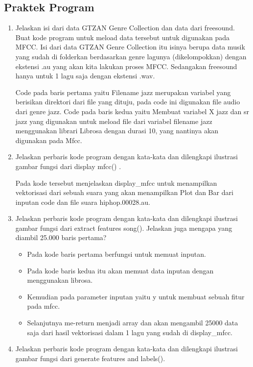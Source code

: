 \subsection{Praktek Program}
\begin{enumerate}
\item Jelaskan isi dari data GTZAN Genre Collection dan data dari freesound. Buat kode program untuk meload data tersebut untuk digunakan pada MFCC.
\subitem Isi dari data GTZAN Genre Collection itu isinya berupa data musik yang sudah di folderkan berdasarkan genre lagunya (dikelompokkan) dengan ekstensi .au yang akan kita lakukan proses MFCC. Sedangakan freesound hanya untuk 1 lagu saja dengan ekstensi .wav.

\subitem Code pada baris pertama yaitu Filename jazz merupakan variabel yang berisikan direktori dari file yang dituju, pada code ini digunakan file audio dari genre jazz.
\subitem Code pada baris kedua yaitu Membuat variabel X jazz dan sr jazz yang digunakan untuk meload file dari variabel filename jazz menggunakan librari Librosa dengan durasi 10, yang nantinya akan digunakan pada Mfcc.
\item Jelaskan perbaris kode program dengan kata-kata dan dilengkapi ilustrasi gambar fungsi dari display mfcc() .

\subitem Pada kode tersebut menjelaskan display\_mfcc untuk menampilkan vektorisasi dari sebuah suara yang akan menampilkan Plot dan Bar dari inputan code dan file suara hiphop.00028.au.
\item Jelaskan perbaris kode program dengan kata-kata dan dilengkapi ilustrasi gambar fungsi dari extract features song(). Jelaskan juga mengapa yang diambil 25.000 baris pertama?

\begin{itemize}
\item Pada kode baris pertama berfungsi untuk memuat inputan. 
\item Pada kode baris kedua itu akan memuat data inputan dengan menggunakan librosa.
\item Kemudian pada parameter inputan yaitu y untuk membuat sebuah fitur pada mfcc.
\item Selanjutnya me-return menjadi array dan akan mengambil 25000 data saja dari hasil vektorisasi dalam 1 lagu yang sudah di display\_mfcc.  
\end{itemize}
\item Jelaskan perbaris kode program dengan kata-kata dan dilengkapi ilustrasi gambar fungsi dari generate features and labels().

\end{enumerate}
